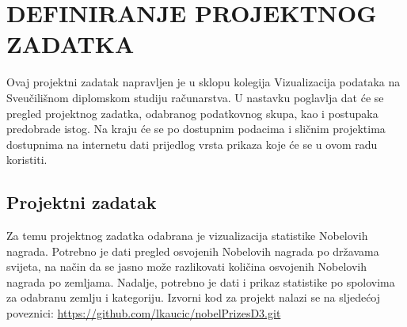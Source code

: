 \documentclass[12pt]{article}
\numberwithin{equation}{section}
\begin{document}
\section{DEFINIRANJE PROJEKTNOG ZADATKA}
Ovaj projektni zadatak napravljen je u sklopu kolegija Vizualizacija podataka na Sveučilišnom diplomskom studiju računarstva. U nastavku poglavlja dat će se pregled projektnog zadatka, odabranog podatkovnog skupa, kao i postupaka predobrade istog. Na kraju će se po dostupnim podacima i sličnim projektima dostupnima na internetu dati prijedlog vrsta prikaza koje će se u ovom radu koristiti. 
\subsection{Projektni zadatak}
Za temu projektnog zadatka odabrana je vizualizacija statistike Nobelovih nagrada. Potrebno je dati pregled osvojenih Nobelovih nagrada po državama svijeta, na način da se jasno može razlikovati količina osvojenih Nobelovih nagrada po zemljama. Nadalje, potrebno je dati i prikaz statistike po spolovima za odabranu zemlju i kategoriju. Izvorni kod za projekt nalazi se na sljedećoj poveznici: \url{https://github.com/lkaucic/nobelPrizesD3.git}
\end{document}
